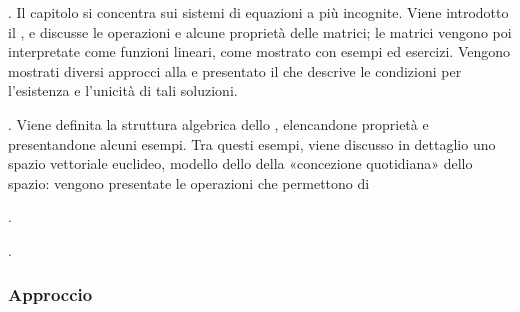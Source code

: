 \documentclass[letterpaper,10pt,italian]{jupyterBook}
\begin{document}
\sphinxAtStartPar
{\hyperref[\detokenize{ch/algebra/linear-algebra:math-hs-algebra-linear}]{}}. Il capitolo si concentra sui sistemi di equazioni  a più incognite. Viene introdotto il , e discusse le operazioni e alcune proprietà delle matrici; le matrici vengono poi interpretate come funzioni lineari, come mostrato con esempi ed esercizi. Vengono mostrati diversi approcci alla  e presentato il  che descrive le condizioni per l’esistenza e l’unicità di tali soluzioni.

\sphinxAtStartPar
{\hyperref[\detokenize{ch/algebra/vector-algebra:math-hs-algebra-vector}]{}}. Viene definita la struttura algebrica dello , elencandone proprietà e presentandone alcuni esempi. Tra questi esempi, viene discusso in dettaglio uno spazio vettoriale euclideo, modello dello della «concezione quotidiana» dello spazio: vengono presentate le operazioni che permettono di

\sphinxAtStartPar
{\hyperref[\detokenize{ch/algebra/complex-algebra:math-hs-algebra-complex}]{}}.

\sphinxAtStartPar
{\hyperref[\detokenize{ch/algebra/set-algebra-link:math-hs-algebra-set-link}]{}}.
\subsubsection*{Approccio}
\end{document}
